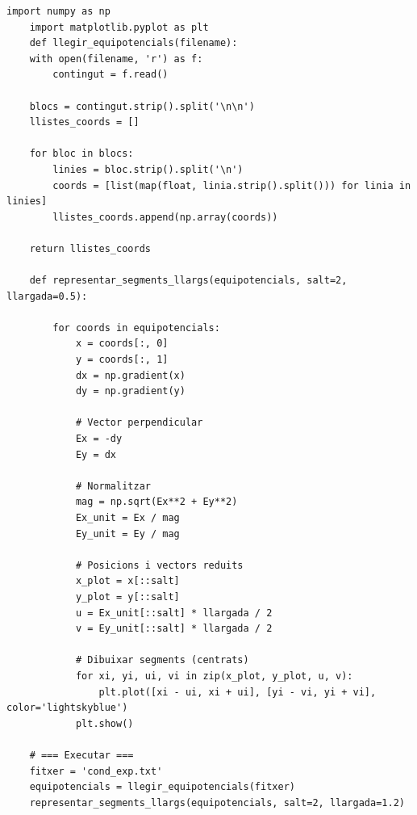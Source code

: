 \documentclass[11pt]{article}
\numberwithin{equation}{section}
\numberwithin{figure}{section}
\numberwithin{table}{section}
\begin{document}
\begin{lstlisting}[caption={Camp elèctric experimental}, label={lst:exp_camp}]
    import numpy as np
    import matplotlib.pyplot as plt
    def llegir_equipotencials(filename):
    with open(filename, 'r') as f:
        contingut = f.read()

    blocs = contingut.strip().split('\n\n')
    llistes_coords = []

    for bloc in blocs:
        linies = bloc.strip().split('\n')
        coords = [list(map(float, linia.strip().split())) for linia in linies]
        llistes_coords.append(np.array(coords))

    return llistes_coords

    def representar_segments_llargs(equipotencials, salt=2, llargada=0.5):
        
        for coords in equipotencials:
            x = coords[:, 0]
            y = coords[:, 1]
            dx = np.gradient(x)
            dy = np.gradient(y)

            # Vector perpendicular
            Ex = -dy
            Ey = dx

            # Normalitzar
            mag = np.sqrt(Ex**2 + Ey**2)
            Ex_unit = Ex / mag
            Ey_unit = Ey / mag

            # Posicions i vectors reduits
            x_plot = x[::salt]
            y_plot = y[::salt]
            u = Ex_unit[::salt] * llargada / 2
            v = Ey_unit[::salt] * llargada / 2

            # Dibuixar segments (centrats)
            for xi, yi, ui, vi in zip(x_plot, y_plot, u, v):
                plt.plot([xi - ui, xi + ui], [yi - vi, yi + vi], color='lightskyblue')    
            plt.show()

    # === Executar ===
    fitxer = 'cond_exp.txt'
    equipotencials = llegir_equipotencials(fitxer)
    representar_segments_llargs(equipotencials, salt=2, llargada=1.2)
\end{lstlisting}
 
\end{document}
